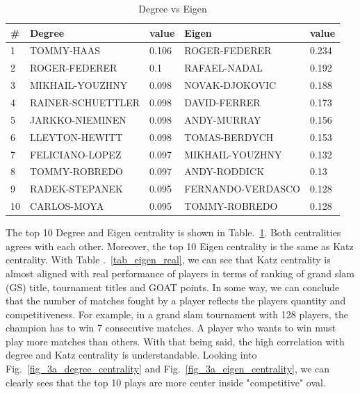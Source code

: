 \documentclass[runningheads]{llncs}
\begin{document}
\begin{table}
\centering
\caption{Degree vs Eigen}\label{tab_degree_eigen}
\begin{tabular}{|l|l|l|l|l|}
\hline
\# & Degree & value & Eigen & value \\ \hline
1 & TOMMY-HAAS & 0.106 & ROGER-FEDERER & 0.234 \\ \hline
2 & ROGER-FEDERER & 0.1 & RAFAEL-NADAL & 0.192 \\ \hline
3 & MIKHAIL-YOUZHNY & 0.098 & NOVAK-DJOKOVIC & 0.188 \\ \hline
4 & RAINER-SCHUETTLER & 0.098 & DAVID-FERRER & 0.173 \\ \hline
5 & JARKKO-NIEMINEN & 0.098 & ANDY-MURRAY & 0.156 \\ \hline
6 & LLEYTON-HEWITT & 0.098 & TOMAS-BERDYCH & 0.153 \\ \hline
7 & FELICIANO-LOPEZ & 0.097 & MIKHAIL-YOUZHNY & 0.132 \\ \hline
8 & TOMMY-ROBREDO & 0.097 & ANDY-RODDICK & 0.13 \\ \hline
9 & RADEK-STEPANEK & 0.095 & FERNANDO-VERDASCO & 0.128 \\ \hline
10 & CARLOS-MOYA & 0.095 & TOMMY-ROBREDO & 0.128 \\ \hline

\end{tabular}
\end{table}

	The top 10 Degree and Eigen centrality is shown in Table.~\ref{tab_degree_eigen}. Both centralities agrees with each other. Moreover, the top 10 Eigen centrality is the same as Katz centrality. With Table .~\ref{tab_eigen_real}, we can see that Katz centrality is almost aligned with real performance of players in terms of ranking of grand slam (GS) title, tournament titles and GOAT points. In some way, we can conclude that the number of matches fought by a player reflects the players quantity and competitiveness. For example, in a grand slam tournament with 128 players, the champion has to win 7 consecutive matches. A player who wants to win must play more matches than others. With that being said, the high correlation with degree and Katz centrality is understandable. Looking into Fig.~\ref{fig_3a_degree_centrality} and Fig.~\ref{fig_3a_eigen_centrality}, we can clearly sees that the top 10 plays are more center inside "competitive" oval.
\end{document}
